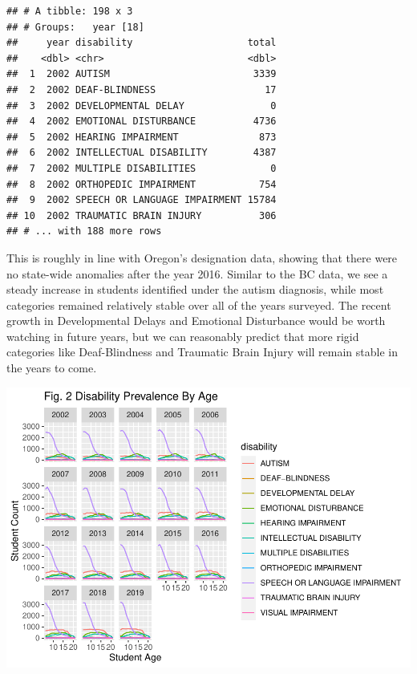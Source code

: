 \documentclass[
  english,
  man,floatsintext]{apa6}
\begin{document}
\begin{verbatim}
## # A tibble: 198 x 3
## # Groups:   year [18]
##     year disability                    total
##    <dbl> <chr>                         <dbl>
##  1  2002 AUTISM                         3339
##  2  2002 DEAF-BLINDNESS                   17
##  3  2002 DEVELOPMENTAL DELAY               0
##  4  2002 EMOTIONAL DISTURBANCE          4736
##  5  2002 HEARING IMPAIRMENT              873
##  6  2002 INTELLECTUAL DISABILITY        4387
##  7  2002 MULTIPLE DISABILITIES             0
##  8  2002 ORTHOPEDIC IMPAIRMENT           754
##  9  2002 SPEECH OR LANGUAGE IMPAIRMENT 15784
## 10  2002 TRAUMATIC BRAIN INJURY          306
## # ... with 188 more rows
\end{verbatim}

This is roughly in line with Oregon's designation data, showing that there were no state-wide anomalies after the year 2016. Similar to the BC data, we see a steady increase in students identified under the autism diagnosis, while most categories remained relatively stable over all of the years surveyed. The recent growth in Developmental Delays and Emotional Disturbance would be worth watching in future years, but we can reasonably predict that more rigid categories like Deaf-Blindness and Traumatic Brain Injury will remain stable in the years to come.

\includegraphics{Final_project_files/figure-latex/Oregon plot-1.pdf}
\end{document}
